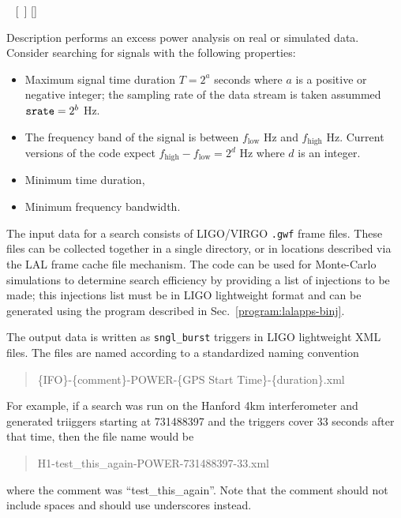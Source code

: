 \begin{entry}
~ \newline \hspace*{0.5in}
[~] \newline \hspace*{0.5in}
[] \newline \hspace*{0.5in}
~ \newline \hspace*{0.5in}
~ \newline \hspace*{0.5in}
~

\item[Description] 
 performs an excess power analysis on real or
simulated data.  Consider searching for signals with the following
properties:
\begin{itemize}
\item Maximum signal time duration $T=2^a$ seconds where $a$ is a positive
or negative integer;  the sampling rate of the data stream is taken
assummed $\mbox{\texttt{srate}} = 2^b$ Hz.

\item The frequency band of the signal is between $f_{\mathrm{low}}$ Hz and
${f_{\mathrm{high}}}$ Hz.  Current versions of the code expect
${f_{\mathrm{high}}}-{f_{\mathrm{low}}}=2^d$ Hz where $d$ is an integer. 

\item Minimum time duration,

\item Minimum frequency bandwidth.
\end{itemize}

The input data for a search consists of LIGO/VIRGO \texttt{.gwf} frame
files.  These files can be collected together in a single directory, or in
locations described via the LAL frame cache file mechanism.  The code can
be used for Monte-Carlo simulations to determine search efficiency by
providing a list of injections to be made;  this injections list must be in
LIGO lightweight format and can be generated using the 
program described in Sec.~\ref{program:lalapps-binj}. 

The output data is written as \verb|sngl_burst| triggers in LIGO
lightweight XML files.  The files are named according to a standardized
naming convention
\begin{quote}
\{IFO\}-\{comment\}-POWER-\{GPS Start Time\}-\{duration\}.xml
\end{quote}
For example, if a search was run on the Hanford 4km interferometer and
generated triiggers starting at 731488397 and the triggers cover 33 seconds
after that time,  then the file name would be 
\begin{quote}
H1-test\_this\_again-POWER-731488397-33.xml
\end{quote}
where the comment was ``test\_this\_again''.  Note that the comment should
not include spaces and should use underscores instead.


\end{entry}
